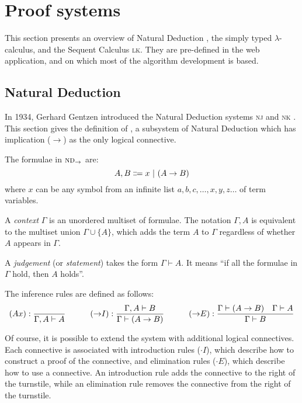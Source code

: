 \section{Proof systems}
\label{background:proof-systems}
This section presents an overview of Natural Deduction \ndt{}, the simply typed $\lambda$-calculus, and the Sequent Calculus \textsc{lk}. They are pre-defined in the web application, and on which most of the algorithm development is based.

\subsection{Natural Deduction \texorpdfstring{\ndt{}}{with implication}}
In 1934, Gerhard Gentzen introduced the Natural Deduction systems \textsc{nj} and \textsc{nk} \cite{gentzen:1969}. This section gives the definition of \ndt{}, a subsystem of Natural Deduction which has implication ($\to$) as the only logical connective.
\begin{definition}
    The formulae in $\textsc{nd}_\to$ are:
    \[
        A, B \Coloneqq x \ |\  (A \to B)
    \]
    where $x$ can be any symbol from an infinite list $a, b, c, \ldots, x, y, z \ldots$ of term variables.
\end{definition}
\begin{definition}
    A \textit{context} $\Gamma$ is an unordered multiset of formulae. The notation $\Gamma, A$ is equivalent to the multiset union $\Gamma \cup \{ A \}$, which adds the term $A$ to $\Gamma$ regardless of whether $A$ appears in $\Gamma$.
\end{definition}
\begin{definition}
    A \textit{judgement} (or \textit{statement}) takes the form $\Gamma \vdash A$. It means ``if all the formulae in $\Gamma$ hold, then $A$ holds''.
\end{definition}
\begin{definition}
    The inference rules are defined as follows:
    {
        \derivationfont
        \[
            (Ax): \frac{}{\Gamma, A \vdash A} \quad\quad\quad (\mathord{\to} I): \frac{\Gamma, A \vdash B}{\Gamma \vdash (A \to B)} \quad\quad\quad (\mathord{\to} E): \frac{\Gamma \vdash (A \to B) \quad \Gamma \vdash A}{\Gamma \vdash B}
        \]
    }%
\end{definition}
Of course, it is possible to extend the system with additional logical connectives. Each connective is associated with introduction rules ($\cdot I$), which describe how to construct a proof of the connective, and elimination rules ($\cdot E$), which describe how to use a connective. An introduction rule adds the connective to the right of the turnstile, while an elimination rule removes the connective from the right of the turnstile.

